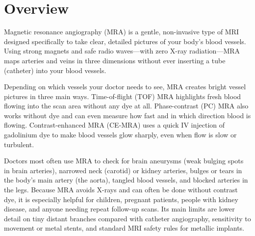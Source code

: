 \label{ch:infographic-mra}

\section{Overview}

Magnetic resonance angiography (MRA) is a gentle, non-invasive type of MRI designed specifically to take clear, detailed pictures of your body's blood vessels. Using strong magnets and safe radio waves---with zero X-ray radiation---MRA maps arteries and veins in three dimensions without ever inserting a tube (catheter) into your blood vessels.

Depending on which vessels your doctor needs to see, MRA creates bright vessel pictures in three main ways. Time-of-flight (TOF) MRA highlights fresh blood flowing into the scan area without any dye at all. Phase-contrast (PC) MRA also works without dye and can even measure how fast and in which direction blood is flowing. Contrast-enhanced MRA (CE-MRA) uses a quick IV injection of gadolinium dye to make blood vessels glow sharply, even when flow is slow or turbulent.

Doctors most often use MRA to check for brain aneurysms (weak bulging spots in brain arteries), narrowed neck (carotid) or kidney arteries, bulges or tears in the body's main artery (the aorta), tangled blood vessels, and blocked arteries in the legs. Because MRA avoids X-rays and can often be done without contrast dye, it is especially helpful for children, pregnant patients, people with kidney disease, and anyone needing repeat follow-up scans. Its main limits are lower detail on tiny distant branches compared with catheter angiography, sensitivity to movement or metal stents, and standard MRI safety rules for metallic implants.

